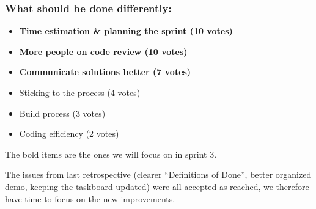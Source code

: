\documentclass[11pt,a4paper]{article}
\begin{document}
\subsubsection*{What should be done differently:}
\begin{itemize}
\item {\bf Time estimation \& planning the sprint (10 votes)}
\item {\bf More people on code review (10 votes)}
\item {\bf Communicate solutions better (7 votes)}
\item Sticking to the process (4 votes)
\item Build process (3 votes)
\item Coding efficiency (2 votes)
\end{itemize}
The bold items are the ones we will focus on in sprint 3.

The issues from last retrospective (clearer ``Definitions of Done'', 
better organized demo, keeping the taskboard updated) were all accepted as 
reached, we therefore have time to focus on the new improvements.
\end{document}
